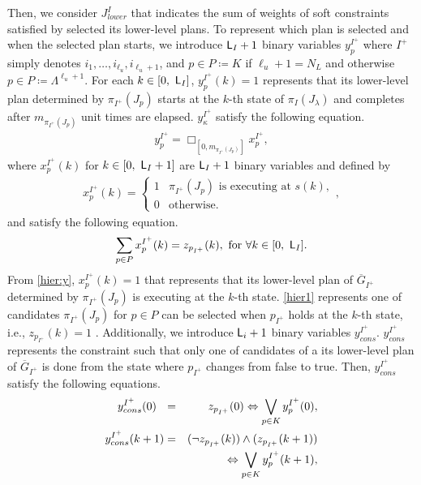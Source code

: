 \documentclass{article}
\newcommand{\req}[1]{\eqref{#1}}
\newcommand{\Len}{{\sf L}}
\newcommand{\G}[1]{\Box_{[#1]}}
\begin{document}
Then, we consider $J_{lower}^{I}$ that indicates the sum of weights of soft constraints satisfied by selected its lower-level plans.
To represent which plan is selected and when the selected plan starts, we introduce $\Len_I + 1$ binary variables ${y}^{{{I^+}}}_{p}$ where ${I^+}$ simply denotes $i_1,\ldots,i_{\ell_u},i_{\ell_u+1}$, and 
$p\in P\coloneqq K$ if ${\ell_u+1}=N_L$ and otherwise $p\in P\coloneqq\Lambda^{\ell_u+1}$.
For each $k\in[0,~\Len_I]$, ${y}^{{I^+}}_{p}(k)=1$ represents that its lower-level plan determined by $\pi_{{I^+}}(J_p)$ starts at the $k$-th state of $\pi_I(J_\lambda)$ and completes after $m_{\pi_{{I^+}}(J_p)}$ unit times are elapsed.
$y^{{I^+}}_{\kappa}$ satisfy the following equation.
\begin{align}
y^{{I^+}}_{p}
=\G{0,m_{\pi_{{I^+}}(J_p)}} x_{p}^{I^+},\label{hier2-1}
\end{align}
where $x_{p}^{I^+}(k)$ for $k\in [0,~\Len_I + 1]$ are $\Len_I + 1$ binary variables and defined by 
\begin{align}\label{hier:y}
x_{p}^{I^+}(k)=
\left\{ \begin{array}{ll}
1 & \mbox{$\pi_{{I^+}}(J_p)$ is executing at }s(k), \\
0 & \mbox{otherwise.}
\end{array} \right. ,
\end{align}
and satisfy the following equation.
\begin{align}\label{hier1}
\sum_{p\in P}x_{p}^{{I^+}}(k) = z_{p_{{I^+}}}(k),~\mbox{for }\forall k\in[0,~\Len_I].
\end{align}
From \req{hier:y}, $x_{p}^{I^+}(k)=1$ that represents that its lower-level plan of $\overline{G}_{{I^+}}$ determined by $\pi_{{I^+}}(J_p)$ is executing at the $k$-th state.
\req{hier1} represents one of candidates $\pi_{{I^+}}(J_p)$ for $p\in P$ can be selected when $p_{{I^+}}$ holds at the $k$-th state, i.e., $z_{p_{{I^+}}}(k)=1$ .
%
Additionally, we introduce $\Len_i + 1$ binary variables $y^{{I^+}}_{{cons}}$.
$y^{{I^+}}_{{cons}}$ represents the constraint such that only one of candidates of a its lower-level plan of $\overline{G}_{I^+}$ is done from the state where $p_{{I^+}}$ changes from false to true. 
Then, $y^{{I^+}}_{{cons}}$ satisfy the following equations.
%
\begin{eqnarray}
y^{{I^+}}_{{cons}}(0)~~ &=& z_{p_{{I^+}}}(0) \Leftrightarrow\bigvee_{p\in K} {y}^{{I^+}}_{p}(0),\label{hier2-2-0}\\
y^{I^+}_{{cons}}(k+1) &=& (\lnot z_{p_{I^+}}(k))\land (z_{p_{I^+}}(k+1)) 
\notag\\&&~\Leftrightarrow\bigvee_{p\in K} {y}^{I^+}_{p}(k+1),\label{hier2-2}
\end{eqnarray}
\end{document}
